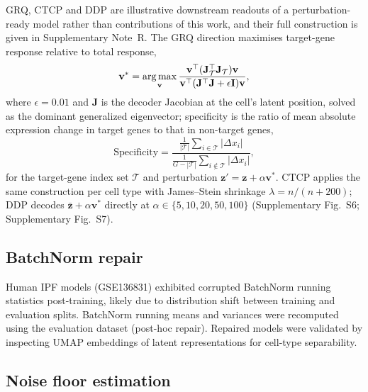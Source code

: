 GRQ, CTCP and DDP are illustrative downstream readouts of a perturbation-ready model rather than contributions of this work, and their full construction is given in Supplementary Note~R. The GRQ direction maximises target-gene response relative to total response,
\begin{equation}
\mathbf{v}^* = \operatorname*{arg\,max}_{\mathbf{v}} \frac{\mathbf{v}^\top (\mathbf{J}_{\mathcal{T}}^\top \mathbf{J}_{\mathcal{T}}) \mathbf{v}}{\mathbf{v}^\top (\mathbf{J}^\top\mathbf{J} + \epsilon\mathbf{I}) \mathbf{v}},
\end{equation}
where $\epsilon=0.01$ and $\mathbf{J}$ is the decoder Jacobian at the cell's latent position, solved as the dominant generalized eigenvector; specificity is the ratio of mean absolute expression change in target genes to that in non-target genes,
\begin{equation}
\text{Specificity} = \frac{\frac{1}{|\mathcal{T}|}\sum_{i\in\mathcal{T}}|\Delta x_i|}{\frac{1}{G-|\mathcal{T}|}\sum_{i\notin\mathcal{T}}|\Delta x_i|},
\end{equation}
for the target-gene index set $\mathcal{T}$ and perturbation $\mathbf{z}' = \mathbf{z} + \alpha\mathbf{v}^*$. CTCP applies the same construction per cell type with James--Stein shrinkage $\lambda = n/(n+200)$; DDP decodes $\bar{\mathbf{z}} + \alpha\mathbf{v}^*$ directly at $\alpha \in \{5, 10, 20, 50, 100\}$ (Supplementary Fig.~S6; Supplementary Fig.~S7).

\subsection*{BatchNorm repair}

Human IPF models (GSE136831) exhibited corrupted BatchNorm running statistics post-training, likely due to distribution shift between training and evaluation splits. BatchNorm running means and variances were recomputed using the evaluation dataset (post-hoc repair). Repaired models were validated by inspecting UMAP embeddings of latent representations for cell-type separability.

\subsection*{Noise floor estimation}

